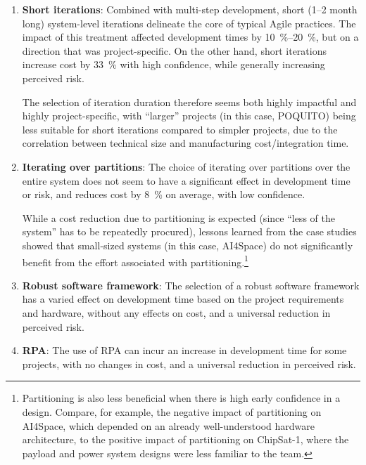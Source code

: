 \documentclass[a4paper,nobib,justified,final]{tufte-book}
\begin{document}
\begin{enumerate}
	The results indicate that multi-step development reduces development time by \qty{25}{\percent} with high confidence. Low-confidence indicators show that it increases cost by \qty{18}{\percent}, with a project-specific change in risk.
	\item \textbf{Short iterations}:
	Combined with multi-step development, short (1--2 month long) system-level iterations delineate the core of typical Agile practices.
	The impact of this treatment affected development times by \qtyrange{10}{20}{\percent}, but on a direction that was project-specific. On the other hand, short iterations increase cost by \qty{33}{\percent} with high confidence, while generally increasing perceived risk.

	The selection of iteration duration therefore seems both highly impactful and highly project-specific, with ``larger'' projects (in this case, POQUITO) being less suitable for short iterations compared to simpler projects, due to the correlation between technical size and manufacturing cost/integration time. %
	\item \textbf{Iterating over partitions}:
	The choice of iterating over partitions over the entire system does not seem to have a significant effect in development time or risk, and reduces cost by \qty{8}{\percent} on average, with low confidence.

	While a cost reduction due to partitioning is expected (since ``less of the system'' has to be repeatedly procured), lessons learned from the case studies showed that small-sized systems (in this case, AI4Space) do not significantly benefit from the effort associated with partitioning.\footnote{Partitioning is also less beneficial when there is high early confidence in a design. Compare, for example, the negative impact of partitioning on AI4Space, which depended on an already well-understood hardware architecture, to the positive impact of partitioning on ChipSat-1, where the payload and power system designs were less familiar to the team.}
	\item \textbf{Robust software framework}:
	The selection of a robust software framework has a varied effect on development time based on the project requirements and hardware, without any effects on cost, and a universal reduction in perceived risk.
	\item \textbf{\acf{RPA}}:
	The use of \acl{RPA} can incur an increase in development time for some projects, with no changes in cost, and a universal reduction in perceived risk.
\end{enumerate}
\end{document}
